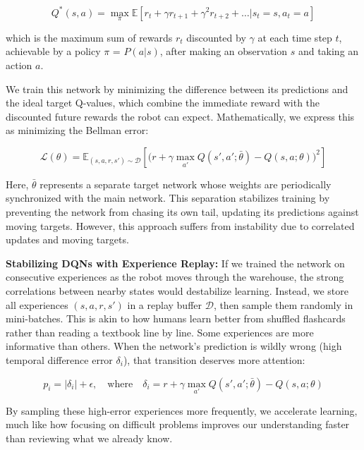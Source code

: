 \documentclass{kththesis}
\begin{document}
\begin{equation}
    Q^*(s,a) = \max_{\pi} \mathbb{E} \left[ r_t + \gamma r_{t+1} + \gamma^2 r_{t+2} + \ldots | s_t = s, a_t = a \right]
\end{equation}

which is the maximum sum of rewards $r_t$ discounted by $\gamma$ at each time step $t$, achievable by a policy $\pi$ = $P(a|s)$, after making an observation $s$ and taking an action $a$.

We train this network by minimizing the difference between its predictions and the ideal target Q-values, which combine the immediate reward with the discounted future rewards the robot can expect. Mathematically, we express this as minimizing the Bellman error:

\begin{equation}
    \mathcal{L}(\theta) = \mathbb{E}_{(s,a,r,s') \sim \mathcal{D}} \left[ \big(r + \gamma \max_{a'} Q(s',a';\bar{\theta}) - Q(s,a;\theta)\big)^2 \right]
\end{equation}

Here, $\bar{\theta}$ represents a separate target network whose weights are periodically synchronized with the main network. This separation stabilizes training by preventing the network from chasing its own tail, updating its predictions against moving targets. However, this approach suffers from instability due to correlated updates and moving targets.

\textbf{Stabilizing DQNs with Experience Replay:}
If we trained the network on consecutive experiences as the robot moves through the warehouse, the strong correlations between nearby states would destabilize learning. Instead, we store all experiences $(s,a,r,s')$ in a replay buffer $\mathcal{D}$, then sample them randomly in mini-batches. This is akin to how humans learn better from shuffled flashcards rather than reading a textbook line by line. Some experiences are more informative than others. When the network's prediction is wildly wrong (high temporal difference error $\delta_i$), that transition deserves more attention:

\begin{equation}
    p_i = |\delta_i| + \epsilon, \quad \text{where} \quad \delta_i = r + \gamma \max_{a'} Q(s',a';\bar{\theta}) - Q(s,a;\theta)
\end{equation}

By sampling these high-error experiences more frequently, we accelerate learning, much like how focusing on difficult problems improves our understanding faster than reviewing what we already know. 
\end{document}
